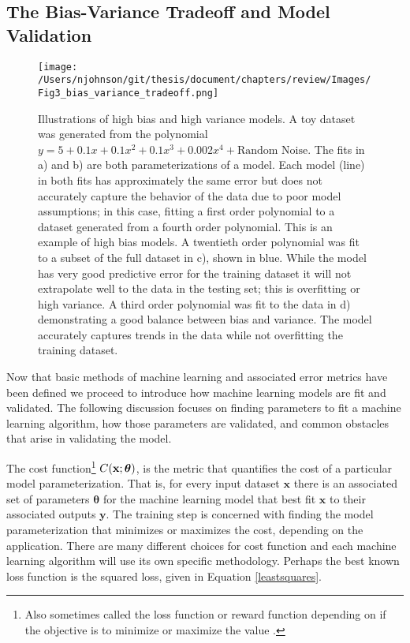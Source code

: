 \subsection{The Bias-Variance Tradeoff and Model Validation}\label{bvar}


\begin{figure*}
	\texttt{[image: /Users/njohnson/git/thesis/document/chapters/review/Images/Fig3\_bias\_variance\_tradeoff.png]}
	\caption{Illustrations of high bias and high variance models. A toy dataset was generated from the polynomial $y=5+0.1x+0.1x^2+0.1x^3+0.002x^4+ \text{Random Noise}$. The fits in a) and b) are both parameterizations of a model. Each model (line) in both fits has approximately the same error but does not accurately capture the behavior of the data due to poor model assumptions; in this case, fitting a first order polynomial to a dataset generated from a fourth order polynomial. This is an example of high bias models. A twentieth order polynomial was fit to a subset of the full dataset in c), shown in blue. While the model has very good predictive error for the training dataset it will not extrapolate well to the data in the testing set; this is overfitting or high variance. A third order polynomial was fit to the data in d) demonstrating a good balance between bias and variance. The model accurately captures trends in the data while not overfitting the training dataset.}
	\label{biasvariance}
\end{figure*}

Now that basic methods of machine learning and associated error metrics have been defined we proceed to introduce how machine learning models are fit and validated. The following discussion focuses on finding parameters to fit a machine learning algorithm, how those parameters are validated, and common obstacles that arise in validating the model.

The cost function\footnote{Also sometimes called the loss function or reward function depending on if the objective is to minimize or maximize the value \cite{CostFunction}.} $C({\bf x}; \boldsymbol{\theta})$, is the metric that quantifies the cost of a particular model parameterization. That is, for every input dataset $\mathbf{x}$ there is an associated set of parameters $\boldsymbol{\theta}$ for the machine learning model that best fit $\mathbf{x}$ to their associated outputs $\mathbf{y}$. The training step is concerned with finding the model parameterization that minimizes or maximizes the cost, depending on the application. There are many different choices for cost function and each machine learning algorithm will use its own specific methodology. Perhaps the best known loss function is the squared loss, given in Equation \ref{leastsquares}. 

